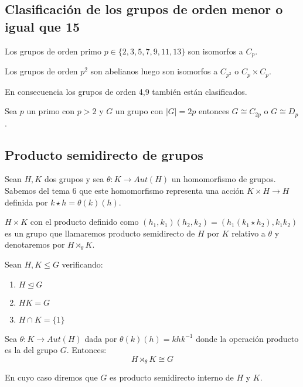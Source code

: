 \subsection{Clasificación de los grupos de orden menor o igual que 15}

Los grupos de orden primo $p \in \{2,3,5,7,9,11,13\}$ son isomorfos a $C_p$. 

Los grupos de orden $p^2$ son abelianos luego son isomorfos a $C_{p^2}$ o $C_p \times C_p$. 

En consecuencia los grupos de orden 4,9 también están clasificados. 

\begin{proposition}
Sea $p$ un primo con $p > 2$ y $G$ un grupo con $|G| = 2p$ entonces $G \cong C_{2p}$ o $G \cong D_p$. 
\end{proposition}

\subsection{Producto semidirecto de grupos}

\begin{proposition}
Sean $H,K$ dos grupos y sea $\theta:K \to Aut(H)$ un homomorfismo de grupos. Sabemos del tema 6 que este homomorfismo representa una acción $K \times H \to H$ definida por $k \star h = \theta(k)(h)$. 

$H \times K$ con el producto definido como $(h_1,k_1)(h_2,k_2) = (h_1(k_1 \star h_2),k_1k_2)$ es un grupo que llamaremos producto semidirecto de $H$ por $K$ relativo a $\theta$ y denotaremos por $H \rtimes_{\theta} K$. 
\end{proposition}

\begin{theorem}
Sean $H,K \le G$ verificando:

\begin{enumerate}
\item $H \trianglelefteq G$
\item $HK = G$
\item $H \cap K = \{1\}$
\end{enumerate}

Sea $\theta:K \to Aut(H)$ dada por $\theta(k)(h) = khk^{-1}$ donde la operación producto es la del grupo $G$. Entonces: $$H\rtimes_{\theta}K \cong G$$

En cuyo caso diremos que $G$ es producto semidirecto interno de $H$ y $K$.
\end{theorem}











